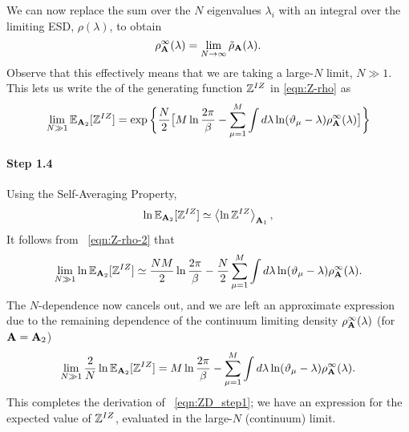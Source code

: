 We can now replace
the sum over the $N$ eigenvalues $\lambda_{i}$ with an integral over the limiting
ESD, $\rho(\lambda)$, to obtain
\begin{equation}
\label{eqn:rho-}
\rho^{\infty}_{\AMAT}(\lambda)=    \lim_{N\rightarrow\infty}\tilde\rho_{\AMAT}(\lambda)  .
\end{equation}
Observe that this effectively means that we are taking a large-$N$ limit, $N\gg 1$.
%
This lets us write the \ExpectedValue of the generating function $\ZD$
in \ref{eqn:Z-rho}
as
\begin{equation}
\label{eqn:Z-rho-2}
    \lim_{N\gg 1}\EZDATWO=\exp\bigg\{\dfrac{N}{2}\big[M\ln\dfrac{2\pi}{\beta}-
    \sum_{\mu=1}^{M}\int
        d\lambda\ln(\DeltaMu-\lambda)\rho^{\infty}_{\AMAT}(\lambda)\big]\bigg\}
\end{equation}

\paragraph{Step 1.4}

Using the Self-Averaging Property,
\begin{equation}
   \ln \EZDATWO \simeq \Expected[\mathbf{A}_1]{\ln \ZD} ,
\end{equation}
It follows from \EQN~\ref{eqn:Z-rho-2}
that
\begin{equation}
   \lim_{N\gg 1} \ln \EZDATWO
   \simeq \dfrac{N M}{2}\ln\dfrac{2\pi}{\beta}
         -\dfrac{N}{2}\sum_{\mu=1}^{M}\int d\lambda\ln(\DeltaMu-\lambda)\rho^{\infty}_{\AMAT}(\lambda)  .
\end{equation}
%
The $N$-dependence now cancels out,
and we are left an approximate expression due to the remaining dependence of the continuum limiting density
$\rho^{\infty}_{\AMAT}(\lambda)$ (for $\AMAT=\mathbf{A}_{2}$)
%
\begin{equation}
\label{eqn:ln-Z-Nlim2}
    \lim_{N \gg 1}\dfrac{2}{N}\ln \EZDATWO
    = M\ln\dfrac{2\pi}{\beta}-\sum_{\mu=1}^{M}\int d\lambda\ln(\DeltaMu-\lambda)\rho^{\infty}_{\AMAT}(\lambda)  .
\end{equation}
This completes the derivation of \EQN~\ref{eqn:ZD_step1}; 
we have an expression for the expected value of $\ZD$,
evaluated in the large-$N$ (continuum) limit.

